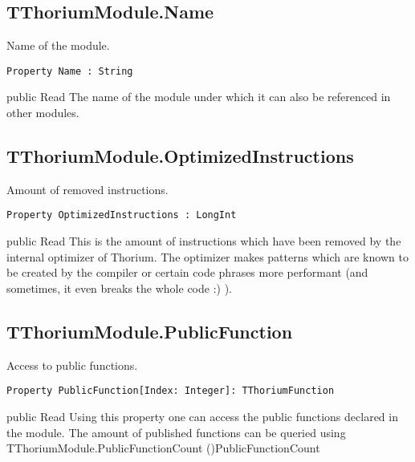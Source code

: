 \subsection{TThoriumModule.Name}
\label{thoriumcorepkg:thorium:tthoriummodule:name}
\begin{FPCList}
\Synopsis
Name of the module.\Declaration 

\begin{verbatim}
Property Name : String
\end{verbatim}
\Visibility
public
\Access
Read
\Description
The name of the module under which it can also be referenced in other modules.\end{FPCList}
\subsection{TThoriumModule.OptimizedInstructions}
\label{thoriumcorepkg:thorium:tthoriummodule:optimizedinstructions}
\begin{FPCList}
\Synopsis
Amount of removed instructions.\Declaration 

\begin{verbatim}
Property OptimizedInstructions : LongInt
\end{verbatim}
\Visibility
public
\Access
Read
\Description
This is the amount of instructions which have been removed by the internal optimizer of Thorium. The optimizer makes patterns which are known to be created by the compiler or certain code phrases more performant (and sometimes, it even breaks the whole code :) ).\end{FPCList}
\subsection{TThoriumModule.PublicFunction}
\label{thoriumcorepkg:thorium:tthoriummodule:publicfunction}
\begin{FPCList}
\Synopsis
Access to public functions.\Declaration 

\begin{verbatim}
Property PublicFunction[Index: Integer]: TThoriumFunction
\end{verbatim}
\Visibility
public
\Access
Read
\Description
Using this property one can access the public functions declared in the module. The amount of published functions can be queried using TThoriumModule.PublicFunctionCount (\pageref{thoriumcorepkg:thorium:tthoriummodule:publicfunctioncount})PublicFunctionCount\end{FPCList}
